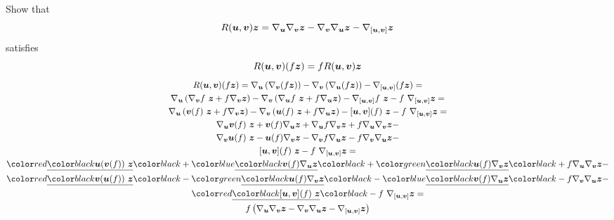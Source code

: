 
\chapter{}

\problem

Show that
%
\begin{equation}
    R(\boldsymbol{u},\boldsymbol{v})\boldsymbol{z} =
    \nabla_{\boldsymbol{u}} \nabla_{\boldsymbol{v}} \boldsymbol{z} -
    \nabla_{\boldsymbol{v}} \nabla_{\boldsymbol{u}} \boldsymbol{z} -
    \nabla_{[\boldsymbol{u},\boldsymbol{v}]} \boldsymbol{z}
\end{equation}
%
satisfies
%
\begin{equation}
    R(\boldsymbol{u},\boldsymbol{v})(f\boldsymbol{z}) = f R(\boldsymbol{u},\boldsymbol{v})\boldsymbol{z}
\end{equation}
%
\begin{multline}
    R(\bs{u},\bs{v})(f\bs{z}) =
    \nabla_{\bs{u}} \left(\nabla_{\bs{v}} (f\bs{z})\right) -
    \nabla_{\bs{v}} \left(\nabla_{\bs{u}} (f\bs{z})\right) -
    \nabla_{[\bs{u},\bs{v}]} (f\bs{z}) = \\
    \nabla_{\bs{u}} \left(\nabla_{\bs{v}}f~\bs{z} + f \nabla_{\bs{v}}\bs{z}\right) -
    \nabla_{\bs{v}} \left(\nabla_{\bs{u}}f~\bs{z} + f \nabla_{\bs{u}}\bs{z}\right) -
    \nabla_{[\bs{u},\bs{v}]}f~\bs{z} - f~\nabla_{[\bs{u},\bs{v}]}\bs{z} = \\
    \nabla_{\bs{u}} \left(\bs{v}(f)~\bs{z} + f \nabla_{\bs{v}}\bs{z}\right) -
    \nabla_{\bs{v}} \left(\bs{u}(f)~\bs{z} + f \nabla_{\bs{u}}\bs{z}\right) -
    [\bs{u},\bs{v}](f)~\bs{z} - f~\nabla_{[\bs{u},\bs{v}]}\bs{z} = \\
    \nabla_{\bs{u}}\bs{v}(f)~\bs{z} + \bs{v}(f)\nabla_{\bs{u}}\bs{z} +
    \nabla_{\bs{u}}f \nabla_{\bs{v}}\bs{z} + f \nabla_{\bs{u}}\nabla_{\bs{v}}\bs{z} - \\
    \nabla_{\bs{v}}\bs{u}(f)~\bs{z} - \bs{u}(f)\nabla_{\bs{v}}\bs{z} -
    \nabla_{\bs{v}}f \nabla_{\bs{u}}\bs{z} - f \nabla_{\bs{v}}\nabla_{\bs{u}}\bs{z} - \\
    [\bs{u},\bs{v}](f)~\bs{z} - f~\nabla_{[\bs{u},\bs{v}]}\bs{z} = \\
    \mathunderline{red}{\bs{u}(\bs{v}(f))~\bs{z}} +
    \mathunderline{blue}{\bs{v}(f)\nabla_{\bs{u}}\bs{z}} +
    \mathunderline{green}{\bs{u}(f) \nabla_{\bs{v}}\bs{z}} +
    f \nabla_{\bs{u}}\nabla_{\bs{v}}\bs{z} - \\
    \mathunderline{red}{\bs{v}(\bs{u}(f))~\bs{z}} -
    \mathunderline{green}{\bs{u}(f)\nabla_{\bs{v}}\bs{z}} -
    \mathunderline{blue}{\bs{v}(f) \nabla_{\bs{u}}\bs{z}} -
    f \nabla_{\bs{v}}\nabla_{\bs{u}}\bs{z} - \\
    \mathunderline{red}{[\bs{u},\bs{v}](f)~\bs{z}} - f~\nabla_{[\bs{u},\bs{v}]}\bs{z} = \\
    f\left(\nabla_{\bs{u}} \nabla_{\bs{v}} \bs{z} -
    \nabla_{\bs{v}} \nabla_{\bs{u}} \bs{z} -
    \nabla_{[\bs{u},\bs{v}]} \bs{z}\right)
\end{multline}

